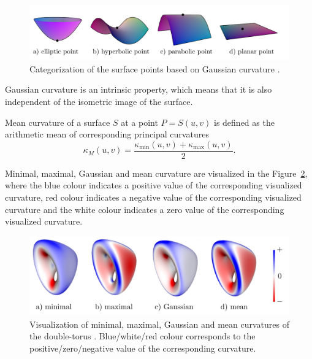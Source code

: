 \begin{figure}
    \centerline{\includegraphics[scale=0.5]{images/img33}}
    \caption[Categorization of the surface points based on Gaussian curvature]
    {Categorization of the surface points based on Gaussian curvature \cite{morris2003client}.}
    \label{img:33}
\end{figure}

Gaussian curvature is an
intrinsic property, which means that it is also independent of the isometric image of the surface.

\begin{definition}
    Mean curvature of a surface $S$ at a point $P=S(u,v)$ is defined as
    the arithmetic mean of corresponding principal curvatures
    $$\kappa_M(u, v) = \frac{\kappa_{\min}(u,v) + \kappa_{\max}(u,v)}{2}.$$
\end{definition}

Minimal, maximal, Gaussian and mean curvature are visualized in the Figure~\ref{img:16},
where the blue colour indicates a positive value of the corresponding visualized curvature,
red colour indicates a negative value of the corresponding visualized curvature
and the white colour indicates a zero value of the corresponding visualized curvature.

\begin{figure}
    \centerline{\includegraphics[scale=0.5]{images/img16}}
    \caption[Visualisation of the curvatures of the double-torus]
    {Visualization of minimal, maximal, Gaussian and mean curvatures of the double-torus \cite{novello2021differential}.
    Blue/white/red colour corresponds to the positive/zero/negative value of the corresponding curvature.}
    \label{img:16}
\end{figure}

